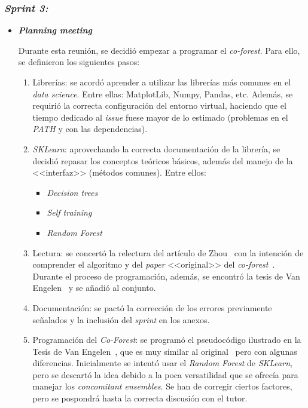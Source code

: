 \subsubsection{\textit{Sprint 3:}}
\begin{itemize}
	\item \textbf{\textit{Planning meeting}}
	
	Durante esta reunión, se decidió empezar a programar el \textit{co-forest}. Para ello, se definieron los siguientes pasos:
	
	\begin{enumerate}
		
		\item Librerías: se acordó aprender a utilizar las librerías más comunes en el \textit{data science}. Entre ellas: MatplotLib, Numpy, Pandas, etc. Además, se requirió la correcta configuración del entorno virtual, haciendo que el tiempo dedicado al \textit{issue} fuese mayor de lo estimado (problemas en el \textit{PATH} y con las dependencias).
		
		\item \textit{SKLearn}: aprovechando la correcta documentación de la librería, se decidió repasar los conceptos teóricos básicos, además del manejo de la <<interfaz>> (métodos comunes). Entre ellos:
		
		\begin{itemize}
			\item \textit{Decision trees}
			\item \textit{Self training}
			\item \textit{Random Forest}
		\end{itemize}
	
		\item Lectura: se concertó la relectura del artículo de Zhou~\cite{zhou2021SemisupervisedRecommendationAttack} con la intención de comprender el algoritmo y del \textit{paper} <<original>> del \textit{co-forest}~\cite{originalCoForest2007}. Durante el proceso de programación, además, se encontró la tesis de Van Engelen~\cite{engelen2018thesis} y se añadió al conjunto.
		
		\item Documentación: se pactó la corrección de los errores previamente señalados y la inclusión del \textit{sprint} en los anexos.
		
		\item Programación del \textit{Co-Forest}: se programó el pseudocódigo ilustrado en la Tesis de Van Engelen~\cite{engelen2018thesis}, que es muy similar al original~\cite{originalCoForest2007} pero con algunas diferencias. Inicialmente se intentó usar el \textit{Random Forest} de \textit{SKLearn}, pero se descartó la idea debido a la poca versatilidad que se ofrecía para manejar los \textit{concomitant ensembles}. Se han de corregir ciertos factores, pero se pospondrá hasta la correcta discusión con el tutor.
		

\end{enumerate}
\end{itemize}
